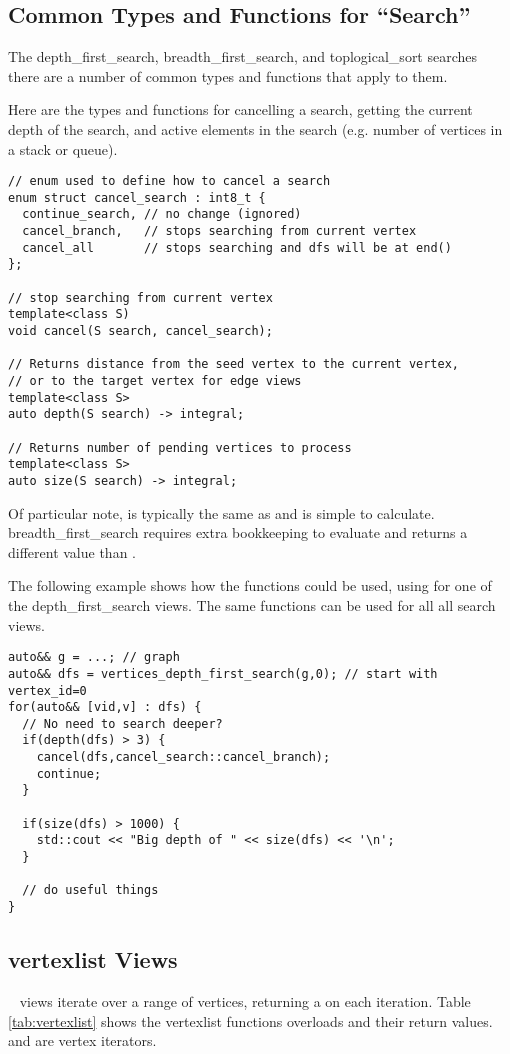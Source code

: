 \subsection{Common Types and Functions for ``Search'' }
The depth\_first\_search, breadth\_first\_search, and toplogical\_sort searches there are a number of common types and functions that apply to them. 

Here are the types and functions for cancelling a search, getting the current depth of the search, and active elements in the search (e.g. number of vertices in a stack or queue).
\begin{lstlisting}
// enum used to define how to cancel a search
enum struct cancel_search : int8_t { 
  continue_search, // no change (ignored)
  cancel_branch,   // stops searching from current vertex
  cancel_all       // stops searching and dfs will be at end()
};

// stop searching from current vertex
template<class S)
void cancel(S search, cancel_search);

// Returns distance from the seed vertex to the current vertex, 
// or to the target vertex for edge views
template<class S>
auto depth(S search) -> integral;

// Returns number of pending vertices to process
template<class S>
auto size(S search) -> integral; 
\end{lstlisting}

Of particular note,  is typically the same as  and is simple to calculate. breadth\_first\_search requires extra bookkeeping to evaluate  and returns a different value than .

The following example shows how the functions  could be used, using  for one of the depth\_first\_search views. The same functions can be used for all all search views.
\begin{lstlisting}
auto&& g = ...; // graph
auto&& dfs = vertices_depth_first_search(g,0); // start with vertex_id=0
for(auto&& [vid,v] : dfs) {
  // No need to search deeper?
  if(depth(dfs) > 3) {
    cancel(dfs,cancel_search::cancel_branch);
    continue;
  }
  
  if(size(dfs) > 1000) {
    std::cout << "Big depth of " << size(dfs) << '\n';
  }
  
  // do useful things
}

\end{lstlisting}

\subsection{vertexlist Views}
\
 views iterate over a range of vertices, returning a  on each iteration. 
Table \ref{tab:vertexlist} shows the vertexlist functions overloads and their return values. \tcode{first} and  are vertex iterators.

